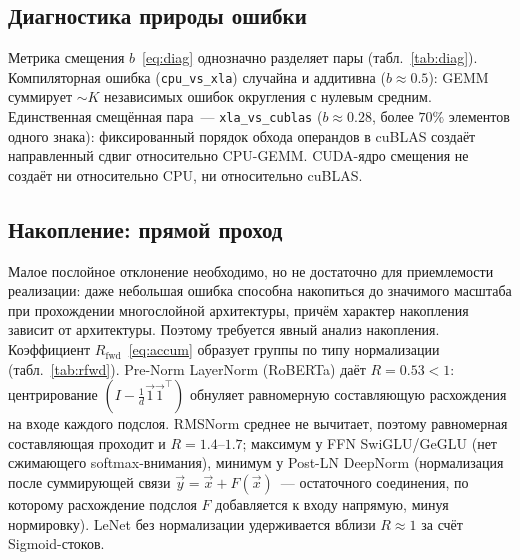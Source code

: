 \subsection{Диагностика природы ошибки}

Метрика смещения $b$~\eqref{eq:diag} однозначно разделяет пары
(табл.~\ref{tab:diag}). Компиляторная ошибка (\texttt{cpu\_vs\_xla}) случайна и
аддитивна ($b\approx0.5$): GEMM суммирует $\sim K$ независимых ошибок округления
с нулевым средним. Единственная смещённая пара~--- \texttt{xla\_vs\_cublas}
($b\approx0.28$, более $70\%$ элементов одного знака): фиксированный порядок
обхода операндов в cuBLAS создаёт направленный сдвиг относительно CPU-GEMM.
CUDA-ядро смещения не создаёт ни относительно CPU, ни относительно cuBLAS.

\begin{table}[htbp]
    \centering
    \caption{Диагностика природы расхождений GEMM-слоёв (прямой проход).}
    \label{tab:diag}
\end{table}

\subsection{Накопление: прямой проход}

Малое послойное отклонение необходимо, но не достаточно для приемлемости
реализации: даже небольшая ошибка способна накопиться до значимого масштаба при
прохождении многослойной архитектуры, причём характер накопления зависит от
архитектуры. Поэтому требуется явный анализ накопления. Коэффициент
$R_{\text{fwd}}$~\eqref{eq:accum} образует группы по типу нормализации
(табл.~\ref{tab:rfwd}). Pre-Norm LayerNorm (RoBERTa) даёт $R=0.53<1$:
центрирование $(I-\tfrac{1}{d}\Vec{1}\Vec{1}^\top)$ обнуляет равномерную
составляющую расхождения на входе каждого подслоя. RMSNorm среднее не вычитает,
поэтому равномерная составляющая проходит и $R=1.4$--$1.7$; максимум у FFN
SwiGLU/GeGLU (нет сжимающего softmax-внимания), минимум у Post-LN DeepNorm
(нормализация после суммирующей связи $\Vec{y}=\Vec{x}+F(\Vec{x})$~--- остаточного
соединения, по которому расхождение подслоя $F$ добавляется к входу напрямую,
минуя нормировку). LeNet без нормализации удерживается вблизи $R\approx1$ за счёт
Sigmoid-стоков.

